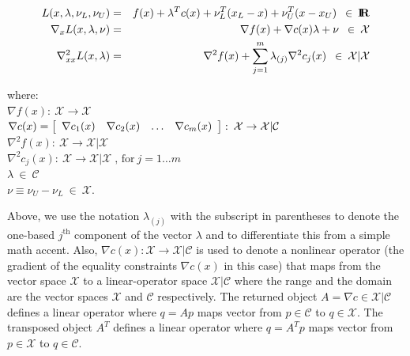 \documentclass[pdf,ps2pdf,11pt]{SANDreport}
\begin{document}
{\bsinglespace
\begin{eqnarray}
L(x,\lambda,\nu_L,\nu_U)
& = & f(x) + \lambda^T c(x) + \nu_L^T ( x_L - x ) + \nu_U^T ( x - x_U ) \; \:\in\:\RE
\label{moocho:eqn:L_def} \\
\nabla_{x} L(x,\lambda,\nu)
& = & \nabla f(x) + \nabla c(x) \lambda + \nu \; \:\in\:\mathcal{X}
\label{moocho:eqn:GL_def} \\
\nabla_{xx}^2 L(x,\lambda)
& = & \nabla^2 f(x) + \sum^m_{j=1} \lambda_{(j)} \nabla^2 c_j(x) \; \:\in\: \mathcal{X}|\mathcal{X}
\label{moocho:eqn:HL_def}
\end{eqnarray}}
%
\begin{tabbing}
\hspace{4ex}where:\hspace{5ex}\= \\
\>	$\nabla f(x) : \:\mathcal{X} \rightarrow \mathcal{X}$ \\
\>	$\nabla c(x) = {\bmat{cccc} \nabla c_1 (x) & \nabla c_2 (x) & \ldots & \nabla c_m (x)  \emat}
         : \:\mathcal{X} \rightarrow \mathcal{X}|\mathcal{C}$ \\
\>	$\nabla^2 f(x) : \:\mathcal{X} \rightarrow \mathcal{X}|\mathcal{X}$ \\
\>	$\nabla^2 c_j(x) : \:\mathcal{X} \rightarrow \mathcal{X}|\mathcal{X} \; \mbox{, for}\:j = 1 \ldots m$ \\
\>	$\lambda \:\in\:\mathcal{C}$ \\
\>	$\nu \equiv \nu_U - \nu_L \:\in\:\mathcal{X}$.
\end{tabbing}

Above, we use the notation $\lambda_{(j)}$ with the subscript in parentheses
to denote the one-based $j^{\mbox{th}}$ component of the vector $\lambda$ and
to differentiate this from a simple math accent.  Also, $\nabla c(x) :
{}\mathcal{X} {}\rightarrow {}\mathcal{X}|\mathcal{C}$ is used to denote a
nonlinear operator (the gradient of the equality constraints $\nabla c(x)$ in
this case) that maps from the vector space $\mathcal{X}$ to a linear-operator
space $\mathcal{X}|\mathcal{C}$ where the range and the domain are the vector
spaces $\mathcal{X}$ and $\mathcal{C}$ respectively.  The returned object $A =
{}\nabla c {}\in\mathcal{X}|\mathcal{C}$ defines a linear operator where $q =
A p$ maps vector from $p \in\mathcal{C}$ to $q {}\in\mathcal{X}$.  The
transposed object $A^T$ defines a linear operator where $q = A^T p$ maps
vector from $p {}\in\mathcal{X}$ to $q {}\in\mathcal{C}$.
\end{document}
